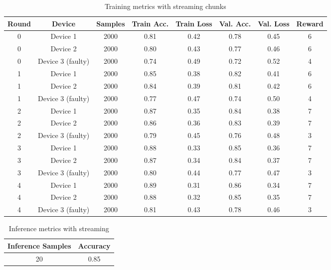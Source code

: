 \begin{table}[h!]
    \centering
    \caption{Training metrics with streaming chunks}
    \label{tab:streaming_chunks}
    \begin{tabular}{c c c c c c c c}
        \toprule
        \textbf{Round} & \textbf{Device} & \textbf{Samples} & \textbf{Train Acc.} & \textbf{Train Loss} & \textbf{Val. Acc.} & \textbf{Val. Loss} & \textbf{Reward} \\
        \midrule
        0 & Device 1 & 2000 & 0.81 & 0.42 & 0.78 & 0.45 & 6 \\
        0 & Device 2 & 2000 & 0.80 & 0.43 & 0.77 & 0.46 & 6 \\
        0 & Device 3 (faulty) & 2000 & 0.74 & 0.49 & 0.72 & 0.52 & 4 \\
        1 & Device 1 & 2000 & 0.85 & 0.38 & 0.82 & 0.41 & 6 \\
        1 & Device 2 & 2000 & 0.84 & 0.39 & 0.81 & 0.42 & 6 \\
        1 & Device 3 (faulty) & 2000 & 0.77 & 0.47 & 0.74 & 0.50 & 4 \\
        2 & Device 1 & 2000 & 0.87 & 0.35 & 0.84 & 0.38 & 7 \\
        2 & Device 2 & 2000 & 0.86 & 0.36 & 0.83 & 0.39 & 7 \\
        2 & Device 3 (faulty) & 2000 & 0.79 & 0.45 & 0.76 & 0.48 & 3 \\
        3 & Device 1 & 2000 & 0.88 & 0.33 & 0.85 & 0.36 & 7 \\
        3 & Device 2 & 2000 & 0.87 & 0.34 & 0.84 & 0.37 & 7 \\
        3 & Device 3 (faulty) & 2000 & 0.80 & 0.44 & 0.77 & 0.47 & 3 \\
        4 & Device 1 & 2000 & 0.89 & 0.31 & 0.86 & 0.34 & 7 \\
        4 & Device 2 & 2000 & 0.88 & 0.32 & 0.85 & 0.35 & 7 \\
        4 & Device 3 (faulty) & 2000 & 0.81 & 0.43 & 0.78 & 0.46 & 3 \\
        \bottomrule
    \end{tabular}
\end{table}

\begin{table}[h!]
    \centering
    \caption{Inference metrics with streaming}
    \label{tab:streaming_inference}
    \begin{tabular}{c c}
        \toprule
        \textbf{Inference Samples} & \textbf{Accuracy} \\
        \midrule
        20 & 0.85 \\
        \bottomrule
    \end{tabular}
\end{table}

